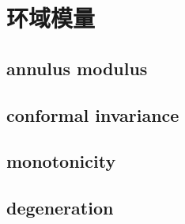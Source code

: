 \section{环域模量}
\label{b3:sec:0802}


\subsection{annulus modulus}
\label{b3:subsec:080201}

\subsection{conformal invariance}
\label{b3:subsec:080202}

\subsection{monotonicity}
\label{b3:subsec:080203}

\subsection{degeneration}
\label{b3:subsec:080204}


